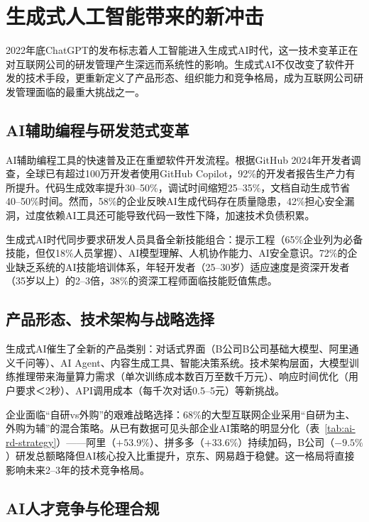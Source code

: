 \section{生成式人工智能带来的新冲击}

2022年底ChatGPT的发布标志着人工智能进入生成式AI时代，这一技术变革正在对互联网公司的研发管理产生深远而系统性的影响\cite{storey2024disruptive}。生成式AI不仅改变了软件开发的技术手段，更重新定义了产品形态、组织能力和竞争格局，成为互联网公司研发管理面临的最重大挑战之一。

\subsection{AI辅助编程与研发范式变革}

AI辅助编程工具的快速普及正在重塑软件开发流程。根据GitHub 2024年开发者调查，全球已有超过100万开发者使用GitHub Copilot，92\%的开发者报告生产力有所提升\cite{github2024copilot}。代码生成效率提升30--50\%，调试时间缩短25--35\%，文档自动生成节省40--50\%时间。然而，58\%的企业反映AI生成代码存在质量隐患，42\%担心安全漏洞，过度依赖AI工具还可能导致代码一致性下降，加速技术负债积累\cite{iresearch2024ai}。

生成式AI时代同步要求研发人员具备全新技能组合：提示工程（65\%企业列为必备技能，但仅18\%人员掌握）、AI模型理解、人机协作能力、AI安全意识。72\%的企业缺乏系统的AI技能培训体系，年轻开发者（25--30岁）适应速度是资深开发者（35岁以上）的2--3倍，38\%的资深工程师面临技能贬值焦虑\cite{ccidconsulting2024ai}。

\subsection{产品形态、技术架构与战略选择}

生成式AI催生了全新的产品类别：对话式界面（B公司B公司基础大模型、阿里通义千问等）、AI Agent、内容生成工具、智能决策系统。技术架构层面，大模型训练推理带来海量算力需求（单次训练成本数百万至数千万元）、响应时间优化（用户要求＜2秒）、API调用成本（每千次对话0.5--5元）等新挑战\cite{idc2024genai}。

企业面临“自研vs外购”的艰难战略选择：68\%的大型互联网企业采用“自研为主、外购为辅”的混合策略\cite{idc2024genai}。从已有数据可见头部企业AI策略的明显分化（表~\ref{tab:ai-rd-strategy}）——阿里（$+53.9\%$）、拼多多（$+33.6\%$）持续加码，B公司（$-9.5\%$）研发总额略降但AI核心投入比重提升，京东、网易趋于稳健。这一格局将直接影响未来2--3年的技术竞争格局。

\subsection{AI人才竞争与伦理合规}

